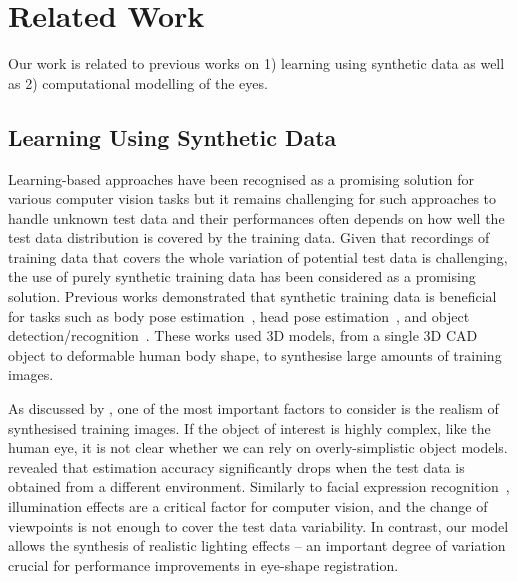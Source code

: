 
\section{Related Work}

Our work is related to previous works on 1) learning using synthetic data as well as 2) computational modelling of the eyes.

\subsection{Learning Using Synthetic Data}

Learning-based approaches have been recognised as a promising solution for various computer vision tasks
but it remains challenging for such approaches to handle unknown test data and their performances often depends on how well the test data distribution is covered by the training data.
Given that recordings of training data that covers the whole variation of potential test data is challenging,
the use of purely synthetic training data has been considered as a promising solution.
Previous works demonstrated that synthetic training data is beneficial for tasks such as body pose estimation~\cite{shakhnarovich2003fast,okada2008relevant,shotton2013real}, head pose estimation~\cite{fanelli2011real}, and object detection/recognition~\cite{yu2010improving,liebelt2010multiview,jaderberg2014synthetic}.
These works used 3D models, from a single 3D CAD object to deformable human body shape, to synthesise large amounts of training images.

As discussed by \citet{kaneva2011evaluation}, one of the most important factors to consider is the realism of synthesised training images.
If the object of interest is highly complex, like the human eye, it is not clear whether we can rely on overly-simplistic object models.
\citet{zhang15_cvpr} revealed that estimation accuracy significantly drops when the test data is obtained from a different environment.
Similarly to facial expression recognition~\cite{stratou2011effect}, illumination effects are a critical factor for computer vision, and the change of viewpoints is not enough to cover the test data variability.
In contrast, our model allows the synthesis of realistic lighting effects -- an important degree of variation crucial for performance improvements in eye-shape registration.

